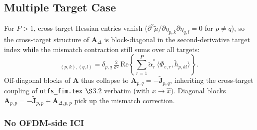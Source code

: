 \documentclass[11pt]{article}
\begin{document}
\subsection{Multiple Target Case}

For \(P > 1\), cross-target Hessian entries vanish (\(\partial^2 \tilde{\mu}/\partial \eta_{p,k} \partial \eta_{q,l} = 0\) for \(p \neq q\)), so the cross-target structure of \(\bm{A}_\Delta\) is block-diagonal in the second-derivative target index while the mismatch contraction still sums over all targets:
\begin{equation}
    [\bm{A}_\Delta]_{(p,k),(q,l)} = \delta_{p,q}\, \tfrac{2}{\sigma^2}\, \mathrm{Re}\!\left\{ \sum_{r=1}^{P} \tilde{\alpha}_r^*\, \langle \Phi_{e,r}, \tilde{h}_{p, kl}\rangle \right\}.
\end{equation}
Off-diagonal blocks of \(\bm{A}\) thus collapse to \(\bm{A}_{p,q} = -\tilde{\bm{J}}_{p,q}\), inheriting the cross-target coupling of \texttt{otfs\_fim.tex} \(\S\)3.2 verbatim (with \(x \to \hat{x}\)). Diagonal blocks \(\bm{A}_{p,p} = -\tilde{\bm{J}}_{p,p} + \bm{A}_{\Delta, p,p}\) pick up the mismatch correction.

\subsubsection{No OFDM-side ICI}
\end{document}
